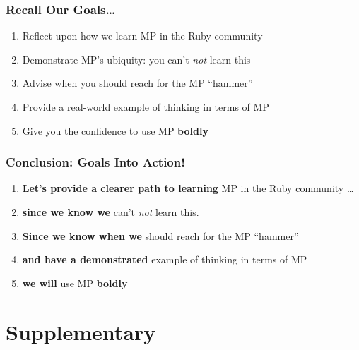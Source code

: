 \documentclass[slidestop,compress,mathserif]{beamer}
\begin{document}
\begin{frame}
	\frametitle{Recall Our Goals\ldots}
	\begin{enumerate}
		\item Reflect upon how we learn MP in the Ruby community
		\item Demonstrate MP's ubiquity:  you can't \emph{not} learn this
		\item Advise when you should reach for the MP ``hammer''
		\item Provide a real-world example of thinking in terms of MP
		\item Give you the confidence to use MP \textbf{boldly}
	\end{enumerate}
\end{frame}

\begin{frame}
	\frametitle{Conclusion:  Goals Into Action!}
	\begin{enumerate}
		\item \textbf{Let's provide a clearer path to learning} MP in the Ruby community \ldots
		\pause
		\item \textbf{since we know we} can't \emph{not} learn this.
		\pause
		\item \textbf{Since we know when we} should reach for the MP ``hammer''
		\pause
		\item \textbf{and have a demonstrated} example of thinking in terms of MP
		\pause
		\item \textbf{we will} use MP \textbf{boldly}
	\end{enumerate}
\end{frame}







\section{Supplementary} %
\label{sec:supplementary}
\end{document}
